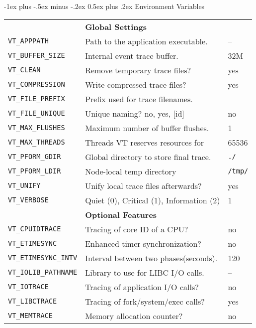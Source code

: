 \documentclass[letterpaper,10pt,landscape]{article}
\makeatletter
\renewcommand{\section}{\@startsection{section}{1}{0mm}%
                                {-1ex plus -.5ex minus -.2ex}%
                                {0.5ex plus .2ex}%
                                {\normalfont\large\bfseries}}
\makeatother
\begin{document}
\begin{multicols}{3}
\section{Environment Variables}
\begin{tabular}{@{}l@{}l@{}l@{}}
\texttt{ } & \textbf{Global Settings} & \texttt{ } \\
\texttt{VT\_APPPATH} & Path to the application executable. & -- \\
\texttt{VT\_BUFFER\_SIZE} & Internal event trace buffer. & 32M \\
\texttt{VT\_CLEAN} & Remove temporary trace files? & yes \\
\texttt{VT\_COMPRESSION} & Write compressed trace files?  & yes \\
\texttt{VT\_FILE\_PREFIX} & Prefix used for trace filenames. & \\
\texttt{VT\_FILE\_UNIQUE} & Unique naming? no, yes, [id] & no \\
\texttt{VT\_MAX\_FLUSHES} & Maximum number of buffer flushes. &	1 \\
\texttt{VT\_MAX\_THREADS} & Threads VT reserves resources for &	65536 \\
\texttt{VT\_PFORM\_GDIR} & Global directory to store final trace. & \texttt{./} \\
\texttt{VT\_PFORM\_LDIR} & Node-local temp directory & \texttt{/tmp/} \\
\texttt{VT\_UNIFY} & Unify local trace files afterwards? & yes \\
\texttt{VT\_VERBOSE} & Quiet (0), Critical (1), Information (2) & 1 \\
\texttt{ } & \textbf{Optional Features} & \texttt{ } \\
\texttt{VT\_CPUIDTRACE} & Tracing of core ID of a CPU? & no \\
\texttt{VT\_ETIMESYNC} & Enhanced timer synchronization? & no \\
\texttt{VT\_ETIMESYNC\_INTV} & Interval between two phases(seconds). & 120 \\
\texttt{VT\_IOLIB\_PATHNAME} & Library to use for LIBC I/O calls. & -- \\
\texttt{VT\_IOTRACE} & Tracing of application I/O calls? & no \\
\texttt{VT\_LIBCTRACE} & Tracing of fork/system/exec calls? & yes \\
\texttt{VT\_MEMTRACE} & Memory allocation counter? & no \\

\end{tabular}
\end{multicols}
\end{document}
